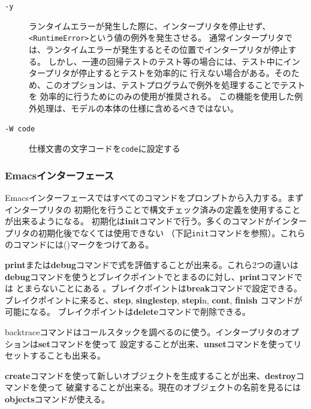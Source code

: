 \documentclass[\pformat,12pt]{jarticle}
\newcommand{\cmd}{\tt }
\begin{document}
\begin{description}
\item[{\tt -y}]
  ランタイムエラーが発生した際に、インタープリタを停止せず、{\tt<RuntimeError>}という値の例外を発生させる。
  通常インタープリタでは、ランタイムエラーが発生するとその位置でインタープリタが停止する。
しかし、一連の回帰テストのテスト等の場合には、テスト中にインタープリタが停止するとテストを効率的に
行えない場合がある。そのため、このオプションは、テストプログラムで例外を処理することでテストを
効率的に行うためにのみの使用が推奨される。
この機能を使用した例外処理は、モデルの本体の仕様に含めるべきではない。

\item[{\tt -W code}] 仕様文書の文字コードを{\tt code}に設定する

\end{description}

\subsubsection{Emacsインターフェース}


Emacsインターフェースではすべてのコマンドをプロンプトから入力する。まずインタープリタの
初期化を行うことで構文チェック済みの定義を使用することが出来るようになる。
初期化は\textbf{init}コマンドで行う。多くのコマンドがインタープリタの初期化後でなくては使用できない
（下記{\cmd init}コマンドを参照）。これらのコマンドには({\tt *})マークをつけてある。

\textbf{print}または\textbf{debug}コマンドで式を評価することが出来る。これら2つの違いは
{\bf debug}コマンドを使うとブレイクポイントでとまるのに対し、{\bf print}コマンドでは
とまらないことにある 。ブレイクポイントは\textbf{break}コマンドで設定できる。
ブレイクポイントに来ると、\textbf{step}, \textbf{singlestep}, \textbf{stepi}n, \textbf{cont}, \textbf{finish} 
コマンドが可能になる。
ブレイクポイントは\textbf{delete}コマンドで削除できる。

backtraceコマンドはコールスタックを調べるのに使う。インタープリタのオプションは\textbf{set}コマンドを使って
設定することが出来、\textbf{unset}コマンドを使ってリセットすることも出来る。

\textbf{create}コマンドを使って新しいオブジェクトを生成することが出来、\textbf{destroy}コマンドを使って
破棄することが出来る。現在のオブジェクトの名前を見るには\textbf{objects}コマンドが使える。
\end{document}
